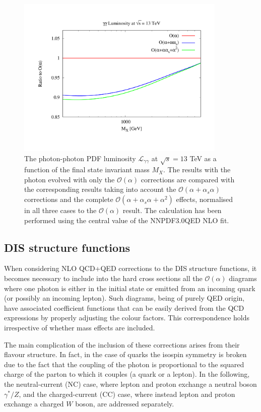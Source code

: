 \begin{figure}[t]
\includegraphics[width=10cm]{figs/lumi_13tev.pdf} 
\caption{The photon-photon PDF luminosity $\mathcal{L}_{\gamma\gamma}$ at $\sqrt{s} = 13$ TeV as a
  function of the final state invariant mass $M_X$.
  The results with the photon evolved
  with only the $\mathcal{O}(\alpha)$ corrections
  are compared with the corresponding results taking into account the 
  $\mathcal{O}(\alpha+\alpha_s\alpha)$ corrections
  and the complete
  $\mathcal{O}(\alpha+\alpha_s\alpha+\alpha^2)$ effects,
  normalised in all three cases to the $\mathcal{O}(\alpha)$ result.
  The calculation has been performed using the central value of the NNPDF3.0QED NLO
  fit.  }
\label{fig:GammaGammaLumi}
\end{figure}

\subsection{DIS structure functions}

When considering NLO QCD+QED corrections to the DIS structure
functions, it becomes necessary to include into the hard cross
sections all the $\mathcal{O}(\alpha)$ diagrams where one photon is
either in the initial state or emitted from an incoming quark (or
possibly an incoming lepton).
%
Such diagrams, being of purely QED origin, have associated coefficient
functions that can be easily derived from the QCD expressions by
properly adjusting the colour factors.
%
This correspondence holds irrespective of whether mass effects are
included.

The main complication of the inclusion of these corrections arises
from their flavour structure. In fact, in the case of
quarks the isospin symmetry is broken due to the fact that the
coupling of the photon is proportional to the squared charge of the
parton to which it couples (a quark or a lepton).
%
In the following, the neutral-current (NC)
case, where lepton and proton exchange a neutral boson $\gamma^*/Z$,
and the charged-current (CC) case, where instead lepton and proton
exchange a charged $W$ boson, are addressed separately.
%

